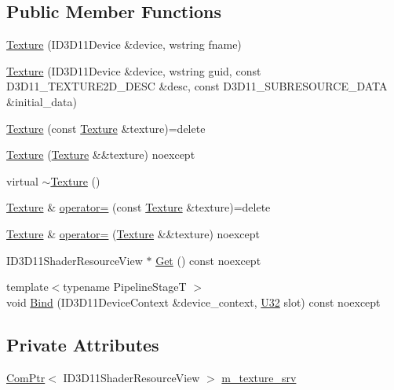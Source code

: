 \subsection*{Public Member Functions}
\begin{DoxyCompactItemize}
\item 
\hyperlink{classmage_1_1rendering_1_1_texture_aedb80382410d26a47574d5032b33b981}{Texture} (I\+D3\+D11\+Device \&device, wstring fname)
\item 
\hyperlink{classmage_1_1rendering_1_1_texture_af8c954ea3d15176b57c2fee0fbf99649}{Texture} (I\+D3\+D11\+Device \&device, wstring guid, const D3\+D11\+\_\+\+T\+E\+X\+T\+U\+R\+E2\+D\+\_\+\+D\+E\+SC \&desc, const D3\+D11\+\_\+\+S\+U\+B\+R\+E\+S\+O\+U\+R\+C\+E\+\_\+\+D\+A\+TA \&initial\+\_\+data)
\item 
\hyperlink{classmage_1_1rendering_1_1_texture_adde9e2339d2c10f1fc527a0d8d41d335}{Texture} (const \hyperlink{classmage_1_1rendering_1_1_texture}{Texture} \&texture)=delete
\item 
\hyperlink{classmage_1_1rendering_1_1_texture_a25eb2aa2277478fb5c17af996d509c57}{Texture} (\hyperlink{classmage_1_1rendering_1_1_texture}{Texture} \&\&texture) noexcept
\item 
virtual \hyperlink{classmage_1_1rendering_1_1_texture_af0ca576b1131fc0ac70725127b4fa7e4}{$\sim$\+Texture} ()
\item 
\hyperlink{classmage_1_1rendering_1_1_texture}{Texture} \& \hyperlink{classmage_1_1rendering_1_1_texture_a8d6af2ca731e11e2f0ef382bc8417234}{operator=} (const \hyperlink{classmage_1_1rendering_1_1_texture}{Texture} \&texture)=delete
\item 
\hyperlink{classmage_1_1rendering_1_1_texture}{Texture} \& \hyperlink{classmage_1_1rendering_1_1_texture_a8c9062f5d8045272c254eb0fa1ab4feb}{operator=} (\hyperlink{classmage_1_1rendering_1_1_texture}{Texture} \&\&texture) noexcept
\item 
I\+D3\+D11\+Shader\+Resource\+View $\ast$ \hyperlink{classmage_1_1rendering_1_1_texture_a7180e555c8e9ba55b364aa0a395d9ab8}{Get} () const noexcept
\item 
{\footnotesize template$<$typename Pipeline\+StageT $>$ }\\void \hyperlink{classmage_1_1rendering_1_1_texture_a2189fabd729f433b96b62fa409968677}{Bind} (I\+D3\+D11\+Device\+Context \&device\+\_\+context, \hyperlink{namespacemage_a41c104c036fba3756a74e19f793eeaa1}{U32} slot) const noexcept
\end{DoxyCompactItemize}
\subsection*{Private Attributes}
\begin{DoxyCompactItemize}
\item 
\hyperlink{namespacemage_ae74f374780900893caa5555d1031fd79}{Com\+Ptr}$<$ I\+D3\+D11\+Shader\+Resource\+View $>$ \hyperlink{classmage_1_1rendering_1_1_texture_a71312b72f42a9a6a90c0b4555e586308}{m\+\_\+texture\+\_\+srv}
\end{DoxyCompactItemize}


